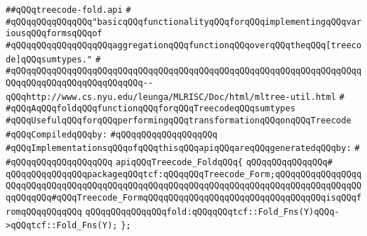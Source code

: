 \label{src/lib/compiler/back/low/treecode/treecode-fold.api}
\verb|##qQQqtreecode-fold.api|\newline
\verb|#|\newline
\verb|#qQQqqQQqqQQqqQQq"basicqQQqfunctionalityqQQqforqQQqimplementingqQQqvariousqQQqformsqQQqof|\newline
\verb|#qQQqqQQqqQQqqQQqqQQqaggregationqQQqfunctionqQQqoverqQQqtheqQQq[treecode]qQQqsumtypes."|\newline
\verb|#|\newline
\verb|#qQQqqQQqqQQqqQQqqQQqqQQqqQQqqQQqqQQqqQQqqQQqqQQqqQQqqQQqqQQqqQQqqQQqqQQqqQQqqQQqqQQqqQQqqQQqqQQq--qQQqhttp://www.cs.nyu.edu/leunga/MLRISC/Doc/html/mltree-util.html|\newline
\verb|#|\newline
\verb|#qQQqAqQQqfoldqQQqfunctionqQQqforqQQqTreecodeqQQqsumtypes|\newline
\verb|#qQQqUsefulqQQqforqQQqperformingqQQqtransformationqQQqonqQQqTreecode|\newline
\newline
\verb|#qQQqCompiledqQQqby:|\newline
\verb|#qQQqqQQqqQQqqQQqqQQq|\newline
\newline
\verb|#qQQqImplementationsqQQqofqQQqthisqQQqapiqQQqareqQQqgeneratedqQQqby:|\newline
\verb|#|\newline
\verb|#qQQqqQQqqQQqqQQqqQQq|\newline
\newline
\verb|apiqQQqTreecode_FoldqQQq{|\newline
\verb|qQQqqQQqqQQqqQQq#|\newline
\verb|qQQqqQQqqQQqqQQqpackageqQQqtcf:qQQqqQQqTreecode_Form;qQQqqQQqqQQqqQQqqQQqqQQqqQQqqQQqqQQqqQQqqQQqqQQqqQQqqQQqqQQqqQQqqQQqqQQqqQQqqQQqqQQqqQQqqQQqqQQq#qQQqTreecode_FormqQQqqQQqqQQqqQQqqQQqqQQqqQQqqQQqqQQqisqQQqfromqQQqqQQqqQQq|\newline
\newline
\verb|qQQqqQQqqQQqqQQqfold:qQQqqQQqtcf::Fold_Fns(Y)qQQq->qQQqtcf::Fold_Fns(Y);|\newline
\verb|};|\newline

